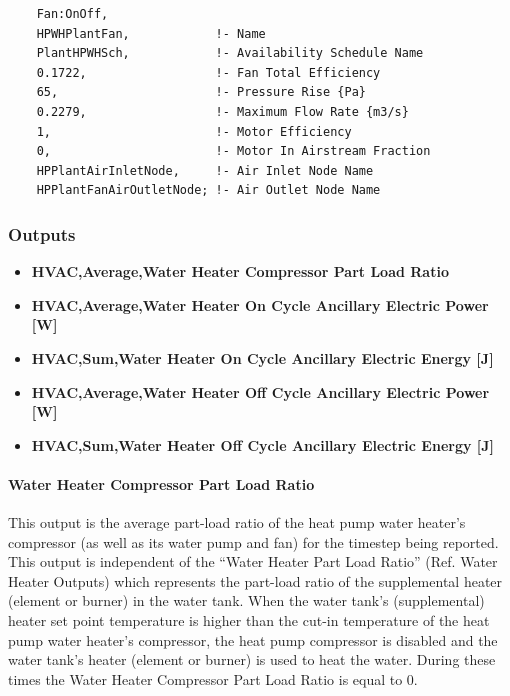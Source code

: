 \begin{lstlisting}
    Fan:OnOff,
    HPWHPlantFan,            !- Name
    PlantHPWHSch,            !- Availability Schedule Name
    0.1722,                  !- Fan Total Efficiency
    65,                      !- Pressure Rise {Pa}
    0.2279,                  !- Maximum Flow Rate {m3/s}
    1,                       !- Motor Efficiency
    0,                       !- Motor In Airstream Fraction
    HPPlantAirInletNode,     !- Air Inlet Node Name
    HPPlantFanAirOutletNode; !- Air Outlet Node Name
\end{lstlisting}

\subsubsection{Outputs}\label{outputs-3-022}

\begin{itemize}
\item
  \textbf{HVAC,Average,Water Heater Compressor Part Load Ratio}
\item
  \textbf{HVAC,Average,Water Heater On Cycle Ancillary Electric Power {[}W{]}}
\item
  \textbf{HVAC,Sum,Water Heater On Cycle Ancillary Electric Energy {[}J{]}}
\item
  \textbf{HVAC,Average,Water Heater Off Cycle Ancillary Electric Power {[}W{]}}
\item
  \textbf{HVAC,Sum,Water Heater Off Cycle Ancillary Electric Energy {[}J{]}}
\end{itemize}

\paragraph{Water Heater Compressor Part Load Ratio}\label{water-heater-compressor-part-load-ratio-1}

This output is the average part-load ratio of the heat pump water heater's compressor (as well as its water pump and fan) for the timestep being reported. This output is independent of the ``Water Heater Part Load Ratio'' (Ref. Water Heater Outputs) which represents the part-load ratio of the supplemental heater (element or burner) in the water tank. When the water tank's (supplemental) heater set point temperature is higher than the cut-in temperature of the heat pump water heater's compressor, the heat pump compressor is disabled and the water tank's heater (element or burner) is used to heat the water. During these times the Water Heater Compressor Part Load Ratio is equal to 0.

